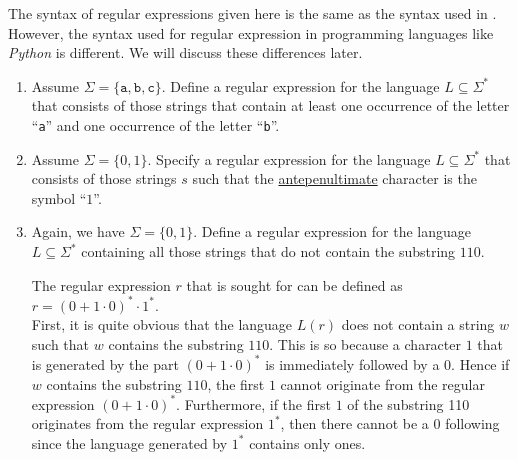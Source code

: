 \remarkEng 
The syntax of regular expressions given here is the same as the syntax used in  \cite{hopcroft:06}.   However,
the syntax used for regular expression in programming languages 
like \textsl{Python} is different.  We will discuss these differences later.
\eox

\exerciseEng
\renewcommand{\labelenumi}{(\alph{enumi})}
\begin{enumerate}
\item Assume $\Sigma = \{ \mathtt{a}, \mathtt{b}, \mathtt{c} \}$.  Define a regular expression for the language
      $L \subseteq \Sigma^*$ that consists of those strings that contain at least one occurrence of
      the letter ``\texttt{a}'' and one occurrence of the letter ``\texttt{b}''.
\item Assume $\Sigma = \{ 0, 1 \}$.   Specify a regular expression for the language 
      $L \subseteq \Sigma^*$ that consists of those strings $s$ such that the
      \href{https://dictionary.cambridge.org/dictionary/english/antepenultimate}{antepenultimate} 
      character is the symbol  ``$1$''.
\item Again, we have $\Sigma = \{ 0, 1 \}$.   Define a regular expression for the language
      $L \subseteq \Sigma^*$ containing all those strings that do not contain the substring  $110$.

      \solutionEng
      The regular expression $r$ that is sought for can be defined as 
      \\[0.2cm]
      \hspace*{1.3cm}
      $r = (0 + 1 \cdot 0)^* \cdot 1^*$.
      \\[0.2cm]
      First, it is quite obvious that the language $L(r)$ does not contain a string $w$ such that
      $w$ contains the substring $110$.  This is so because a character $1$ that is generated by the
      part $(0 + 1 \cdot 0)^*$ is immediately followed by a $0$.  Hence if $w$ contains the
      substring $110$, the first $1$ cannot originate from the regular expression $(0 + 1 \cdot 0)^*$.
      Furthermore, if the first $1$ of the substring 110 originates from the regular expression
      $1^*$, then there cannot be a $0$ following since the language generated by $1^*$ contains
      only ones.


\end{enumerate}
